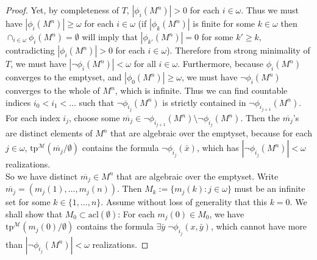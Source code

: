\documentclass{article}
\begin{document}
\begin{enumerate}[label={\bf Q\arabic*:}]
\begin{proof}
      Yet, by completeness of $T$, $|\phi_i(M^n)|>0$ for each $i\in\omega$.
      Thus we must have $|\phi_i(M^n)|\geq\omega$ for each $i\in\omega$ (if
      $|\phi_k(M^n)|$ is finite for some $k\in\omega$ then
      $\cap_{i\in\omega} \phi_i(M^n) =\emptyset$ will imply that
      $|\phi_{k'}(M^n)|=0$ for some $k'\geq k$, contradicting
      $|\phi_i(M^n)|>0$ for each $i\in\omega$). Therefore from strong
      minimality of $T$, we must have $|\neg\phi_i(M^n)|<\omega$ for all
      $i\in\omega$. Furthermore, because $\phi_i(M^n)$ converges to the
      emptyset, and $|\phi_0(M^n)|\geq\omega$, we must have
      $\neg\phi_i(M^n)$ converges to the whole of $M^n$, which is infinite.
      Thus we can find countable indices $i_0<i_1<\ldots$ such that
      $\neg\phi_{i_j}(M^n)$ is strictly contained in
      $\neg\phi_{i_{j+1}}(M^n)$. For each index $i_j$, choose some
      $\overline{m_j}\in \neg\phi_{i_{j+1}}(M^n)\setminus
      \neg\phi_{i_{j}}(M^n)$. Then the $\overline{m_j}$'s are distinct
      elements of $M^n$ that are algebraic over the emptyset, because for
      each $j\in\omega$, $\text{tp}^\mathcal{M}(\overline{m_j}/\emptyset)$
      contains the formula $\neg\phi_{i_j}(\bar{x})$, which has
      $|\neg\phi_{i_j}(M^n)|<\omega$ realizations. \\

      So we have distinct $\overline{m_j}\in M^n$ that are algebraic over
      the emptyset. Write $\overline{m_j}=(m_j(1),\ldots,m_j(n))$. Then
      $M_k:=\{m_j(k):j\in\omega\}$ must be an infinite set for some
      $k\in\{1,\ldots,n\}$. Assume without loss of generality that this
      $k=0$. We shall show that $M_0\subset\text{acl}(\emptyset)$: For each
      $m_j(0)\in M_0$, we have $\text{tp}^\mathcal{M}(m_j(0)/\emptyset)$
      contains the formula $\exists\bar{y}\; \neg\phi_{i_j}(x,\bar{y})$,
      which cannot have more than $|\neg\phi_{i_j}(M^n)|<\omega$
      realizations.
    \end{proof}
\end{enumerate}
\end{document}
